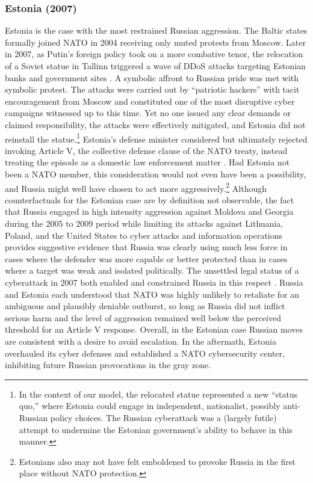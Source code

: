 \documentclass[11pt,letterpaper,pdftex,dvipsnames,table]{article}
\begin{document}
\subsubsection{Estonia (2007)}
Estonia is the case with the most restrained Russian aggression. The Baltic states formally joined NATO in 2004 receiving only  muted protests from Moscow. Later in 2007, as Putin's foreign policy took on a more combative tenor, the relocation of a Soviet statue in Tallinn triggered a wave of DDoS attacks targeting Estonian banks and government sites \citep{schmidt_estoniancyberattacks_2013}. A symbolic affront to Russian pride was met with symbolic protest. The attacks were carried out by ``patriotic hackers'' with tacit encouragement from Moscow and constituted one of the most disruptive cyber campaigns witnessed up to this time. Yet no one issued any clear demands or claimed responsibility, the attacks were effectively mitigated, and Estonia did not reinstall the statue.\footnote{In the context of our model, the relocated statue represented a new ``status quo,'' where Estonia could engage in independent, nationalist, possibly anti-Russian policy choices. The Russian cyberattack was a (largely futile) attempt to undermine the Estonian government's ability to behave in this manner.} Estonia’s defense minister considered but ultimately rejected invoking Article V, the collective defense clause of the NATO treaty, instead treating the episode as a domestic law enforcement matter \citep{traynor_russiaaccusedunleashing_2007}. Had Estonia not been a NATO member, this consideration would not even have been a possibility, and Russia might well have chosen to act more aggressively.\footnote{Estonians also may not have felt emboldened to provoke Russia in the first place without NATO protection.} Although counterfactuals for the Estonian case are by definition not observable, the fact that Russia engaged in high intensity aggression against Moldova and Georgia during the 2005 to 2009 period while limiting its attacks against Lithuania, Poland, and the United States to cyber attacks and information operations provides suggestive evidence that Russia was clearly using much less force in cases where the defender was more capable or better protected than in cases where a target was weak and isolated politically. The unsettled legal status of a cyberattack in 2007 both enabled and constrained Russia in this respect \citep{joubert_fiveyearsestonia_2012}. Russia and Estonia each understood that NATO was highly unlikely to retaliate for an ambiguous and plausibly deniable outburst, so long as Russia did not inflict serious harm and the level of aggression remained well below the perceived threshold for an Article V response. Overall, in the Estonian case Russian moves are consistent with a desire to avoid escalation. In the aftermath, Estonia overhauled its cyber defenses and established a NATO cybersecurity center, inhibiting future Russian provocations in the gray zone.
\end{document}
